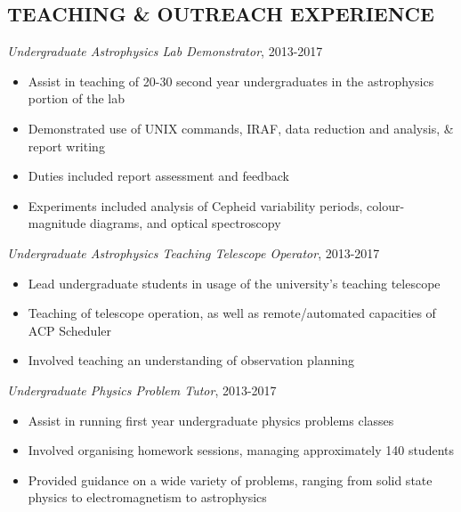 \documentclass[letter, margin, 10pt]{res} %
\begin{document}
\begin{resume}
\section{TEACHING \& OUTREACH EXPERIENCE}

{\sl Undergraduate Astrophysics Lab Demonstrator}, 2013-2017
\begin{itemize}[noitemsep,topsep=0pt,parsep=0pt,partopsep=0pt]
\item Assist in teaching of 20-30 second year undergraduates in the astrophysics portion of the lab
\item Demonstrated use of UNIX commands, IRAF, data reduction and analysis, \& report writing
\item Duties included report assessment and feedback
\item Experiments included analysis of Cepheid variability periods, colour-magnitude diagrams, and optical spectroscopy
\end{itemize}

\vspace{-10pt}

{\sl Undergraduate Astrophysics Teaching Telescope Operator}, 2013-2017
\begin{itemize}[noitemsep,topsep=0pt,parsep=0pt,partopsep=0pt]
\item Lead undergraduate students in usage of the university's teaching telescope
\item Teaching of telescope operation, as well as remote/automated capacities of ACP Scheduler
\item Involved teaching an understanding of observation planning
\end{itemize}

\vspace{-10pt}

{\sl Undergraduate Physics Problem Tutor}, 2013-2017
\begin{itemize}[noitemsep,topsep=0pt,parsep=0pt,partopsep=0pt]
\item Assist in running first year undergraduate physics problems classes
\item Involved organising homework sessions, managing approximately 140 students
\item Provided guidance on a wide variety of problems, ranging from solid state physics to electromagnetism to astrophysics
\end{itemize}

\vspace{-10pt}


\end{resume}
\end{document}
